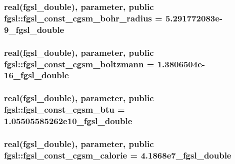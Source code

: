 \subsubsection[{fgsl\+\_\+const\+\_\+cgsm\+\_\+bohr\+\_\+radius}]{\setlength{\rightskip}{0pt plus 5cm}real({\bf fgsl\+\_\+double}), parameter, public fgsl\+::fgsl\+\_\+const\+\_\+cgsm\+\_\+bohr\+\_\+radius = 5.\+291772083e-\/9\+\_\+fgsl\+\_\+double}\label{namespacefgsl_a61da4815b82a64d0b0a2a5737ee854f5}
\hypertarget{namespacefgsl_abe34761700d2098a3dcde1e962938eb4}{}
\subsubsection[{fgsl\+\_\+const\+\_\+cgsm\+\_\+boltzmann}]{\setlength{\rightskip}{0pt plus 5cm}real({\bf fgsl\+\_\+double}), parameter, public fgsl\+::fgsl\+\_\+const\+\_\+cgsm\+\_\+boltzmann = 1.\+3806504e-\/16\+\_\+fgsl\+\_\+double}\label{namespacefgsl_abe34761700d2098a3dcde1e962938eb4}
\hypertarget{namespacefgsl_a01479e6b5bfdbc02efb80e985ca837a6}{}
\subsubsection[{fgsl\+\_\+const\+\_\+cgsm\+\_\+btu}]{\setlength{\rightskip}{0pt plus 5cm}real({\bf fgsl\+\_\+double}), parameter, public fgsl\+::fgsl\+\_\+const\+\_\+cgsm\+\_\+btu = 1.\+05505585262e10\+\_\+fgsl\+\_\+double}\label{namespacefgsl_a01479e6b5bfdbc02efb80e985ca837a6}
\hypertarget{namespacefgsl_a82882b4ac09d9b5f5cd25cff0daa2119}{}
\subsubsection[{fgsl\+\_\+const\+\_\+cgsm\+\_\+calorie}]{\setlength{\rightskip}{0pt plus 5cm}real({\bf fgsl\+\_\+double}), parameter, public fgsl\+::fgsl\+\_\+const\+\_\+cgsm\+\_\+calorie = 4.\+1868e7\+\_\+fgsl\+\_\+double}\label{namespacefgsl_a82882b4ac09d9b5f5cd25cff0daa2119}
\hypertarget{namespacefgsl_a3a07299d97f40e47785e44126a457907}{}

